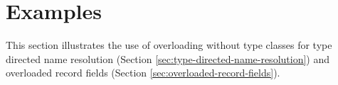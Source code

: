 \section{Examples}
\label{sec:examples}

This section illustrates the use of overloading without type classes
for type directed name resolution (Section
\ref{sec:type-directed-name-resolution}) and overloaded record fields
(Section \ref{sec:overloaded-record-fields}).




